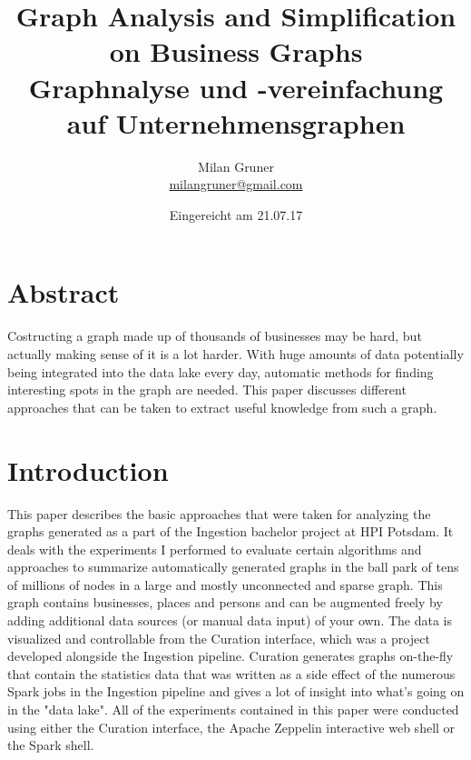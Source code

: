\documentclass[
        a4paper,     %
        titlepage,   %
        oneside,     %
        parskip      %
        ]{scrartcl}  %
\title{
  Graph Analysis and Simplification on Business Graphs
  \\ \bigskip
  \large{Graphnalyse und -vereinfachung auf Unternehmensgraphen}
}
\author{Milan Gruner\\{\small{\url{milangruner@gmail.com}}}}
\date{Eingereicht am 21.07.17}
\begin{document}
  \maketitle %
  \clearpage %

  \section*{Abstract}
  { \large
    Costructing a graph made up of thousands of businesses may be hard, but actually making sense of it is a lot harder.
    With huge amounts of data potentially being integrated into the data lake every day, automatic methods for finding interesting spots in the graph are needed.
    This paper discusses different approaches that can be taken to extract useful knowledge from such a graph.
  }

  \clearpage
  \tableofcontents
  \pagebreak


  \section{Introduction}
    This paper describes the basic approaches that were taken for analyzing the
    graphs generated as a part of the Ingestion bachelor project at HPI Potsdam.
    It deals with the experiments I performed to evaluate certain algorithms and approaches to summarize
    automatically generated graphs in the ball park of tens of millions of nodes in
    a large and mostly unconnected and sparse graph.
    This graph contains businesses, places and persons and can be augmented freely by adding
    additional data sources (or manual data input) of your own. The data is visualized and controllable from the
    Curation interface, which was a project developed alongside the Ingestion pipeline.
    Curation generates graphs on-the-fly that contain the statistics data that was written
    as a side effect of the numerous Spark jobs in the Ingestion pipeline and gives
    a lot of insight into what's going on in the "data lake".
    All of the experiments contained in this paper were conducted using either
    the Curation interface, the Apache Zeppelin interactive web shell or the Spark shell.
\end{document}
